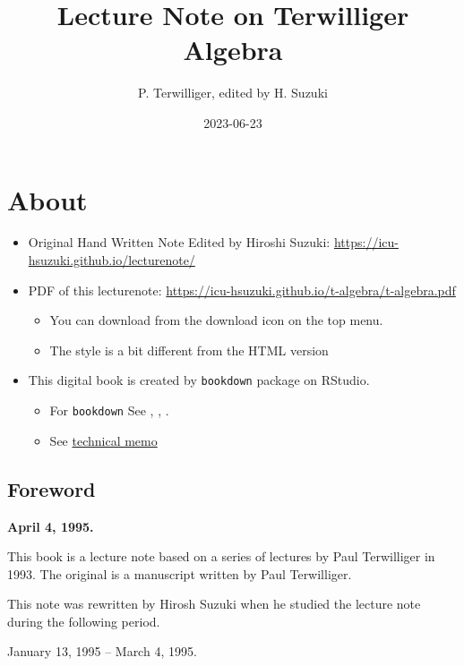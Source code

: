 \documentclass[
]{book}
\title{Lecture Note on Terwilliger Algebra}
\author{P. Terwilliger, edited by H. Suzuki}
\date{2023-06-23}
\providecommand{\tightlist}{%
  \setlength{\itemsep}{0pt}\setlength{\parskip}{0pt}}
\theoremstyle{definition}
\theoremstyle{definition}
\theoremstyle{definition}
\theoremstyle{definition}
\theoremstyle{remark}
\begin{document}
\maketitle

{
\setcounter{tocdepth}{1}
\tableofcontents
}
\hypertarget{about}{%
\chapter*{About}\label{about}}

\begin{itemize}
\tightlist
\item
  Original Hand Written Note Edited by Hiroshi Suzuki: \url{https://icu-hsuzuki.github.io/lecturenote/}
\item
  PDF of this lecturenote: \url{https://icu-hsuzuki.github.io/t-algebra/t-algebra.pdf}

  \begin{itemize}
  \tightlist
  \item
    You can download from the download icon on the top menu.
  \item
    The style is a bit different from the HTML version
  \end{itemize}
\item
  This digital book is created by \texttt{bookdown} package on RStudio.

  \begin{itemize}
  \tightlist
  \item
    For \texttt{bookdown} See \citep{xie2015}, \citep{xie2017}, \citep{xie2018}.
  \item
    See \protect\hyperlink{memo}{technical memo}
  \end{itemize}
\end{itemize}

\hypertarget{foreword}{%
\section*{Foreword}\label{foreword}}

\textbf{April 4, 1995.}

This book is a lecture note based on a series of lectures by Paul Terwilliger in 1993. The original is a manuscript written by Paul Terwilliger.

This note was rewritten by Hirosh Suzuki when he studied the lecture note during the following period.

January 13, 1995 -- March 4, 1995.
\end{document}
